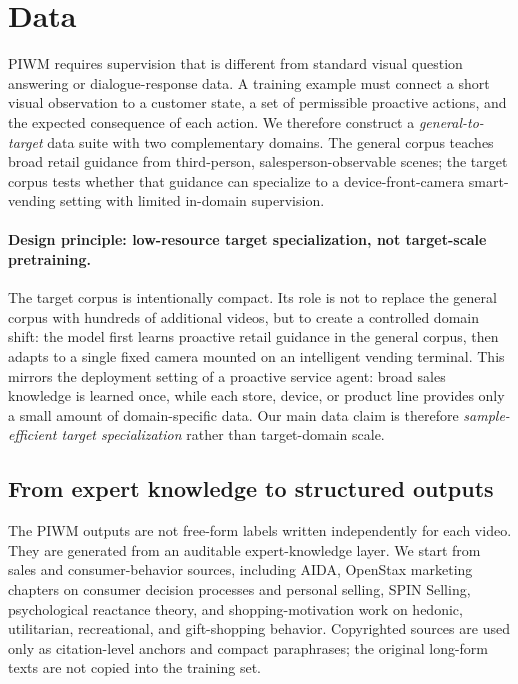 \section{Data}
\label{sec:data}

PIWM requires supervision that is different from standard visual question answering or dialogue-response data. A training example must connect a short visual observation to a customer state, a set of permissible proactive actions, and the expected consequence of each action. We therefore construct a \emph{general-to-target} data suite with two complementary domains. The general corpus teaches broad retail guidance from third-person, salesperson-observable scenes; the target corpus tests whether that guidance can specialize to a device-front-camera smart-vending setting with limited in-domain supervision.

\paragraph{Design principle: low-resource target specialization, not target-scale pretraining.}
The target corpus is intentionally compact. Its role is not to replace the general corpus with hundreds of additional videos, but to create a controlled domain shift: the model first learns proactive retail guidance in the general corpus, then adapts to a single fixed camera mounted on an intelligent vending terminal. This mirrors the deployment setting of a proactive service agent: broad sales knowledge is learned once, while each store, device, or product line provides only a small amount of domain-specific data. Our main data claim is therefore \emph{sample-efficient target specialization} rather than target-domain scale.

\subsection{From expert knowledge to structured outputs}

The PIWM outputs are not free-form labels written independently for each video. They are generated from an auditable expert-knowledge layer. We start from sales and consumer-behavior sources, including AIDA, OpenStax marketing chapters on consumer decision processes and personal selling, SPIN Selling, psychological reactance theory, and shopping-motivation work on hedonic, utilitarian, recreational, and gift-shopping behavior. Copyrighted sources are used only as citation-level anchors and compact paraphrases; the original long-form texts are not copied into the training set.


